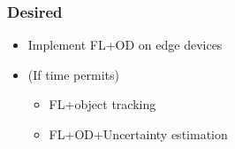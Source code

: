\documentclass[thesis]{mas_proposal}
\begin{document}
\subsubsection*{Desired}
\begin{itemize}
      \item Implement FL+OD on edge devices
      \item (If time permits)
      \begin{itemize}
            \item FL+object tracking
            \item FL+OD+Uncertainty estimation
      \end{itemize}


\end{itemize}


\nocite{*}

\end{document}
